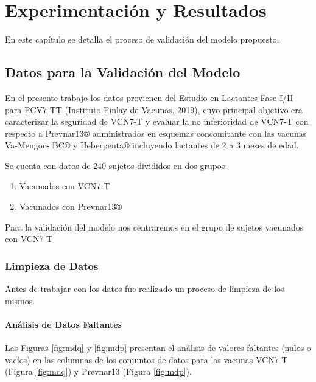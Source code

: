 \chapter{Experimentación y Resultados}\label{chapter:resultados}

En este capítulo se detalla el proceso de validación del modelo propuesto. 

\section{Datos para la Validación del Modelo}
En el presente trabajo los datos provienen del Estudio en Lactantes Fase I/II para PCV7-TT (Instituto Finlay de Vacunas, 2019), cuyo principal objetivo era caracterizar la seguridad de VCN7-T y evaluar la no inferioridad de VCN7-T con respecto a Prevnar13® administrados en esquemas concomitante con las vacunas Va-Mengoc- BC® y Heberpenta® incluyendo lactantes de 2 a 3 meses de edad.

Se cuenta con datos de 240 sujetos divididos en dos grupos:
\begin{enumerate}
    \item Vacunados con VCN7-T
    \item Vacunados con Prevnar13®
\end{enumerate}

Para la validación del modelo nos centraremos en el grupo de sujetos vacunados con VCN7-T

\subsection{Limpieza de Datos}
Antes de trabajar con los datos fue realizado un proceso de limpieza de los mismos. 


\subsubsection{Análisis de Datos Faltantes}

Las Figuras \ref{fig:mdq} y \ref{fig:mdp} presentan el análisis de valores faltantes (nulos o vacíos) en las columnas de los conjuntos de datos para las vacunas VCN7-T (Figura \ref{fig:mdq}) y Prevnar13 (Figura \ref{fig:mdp}). 

